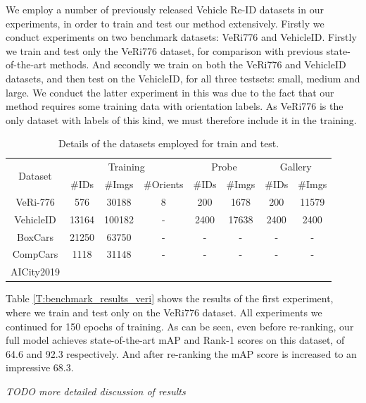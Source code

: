 \documentclass[10pt,twocolumn,letterpaper]{article}
\begin{document}
We employ a number of previously released Vehicle Re-ID datasets in our experiments, in order to train and test our method extensively. Firstly we conduct experiments on two benchmark datasets: VeRi776 and VehicleID. Firstly we train and test only the VeRi776 dataset, for comparison with previous state-of-the-art methods. And secondly we train on both the VeRi776 and VehicleID datasets, and then test on the VehicleID, for all three testsets: small, medium and large. We conduct the latter experiment in this was due to the fact that our method requires some training data with orientation labels. As VeRi776 is the only dataset with labels of this kind, we must therefore include it in the training.

\begin{table}
  \centering
  \begin{tabular}{c || c | c | c || c | c || c | c}
    \hline
    \multirow{2}{*}{Dataset} & \multicolumn{3}{c||}{Training} & \multicolumn{2}{c||}{Probe} & \multicolumn{2}{c}{Gallery} \\
    \cline{2-7}
    & \#IDs& \#Imgs & \#Orients & \#IDs & \#Imgs & \#IDs & \#Imgs \\
    \hline
    VeRi-776 \cite{} & 576 & 30188 & 8 & 200 & 1678 & 200 & 11579 \\
    VehicleID \cite{} & 13164 & 100182 & - & 2400 & 17638 & 2400 & 2400 \\
    BoxCars \cite{} & 21250 & 63750 & -  & - & - & - & - \\
    CompCars \cite{} & 1118 & 31148 & - & - & - & - & - \\
    AICity2019 \cite{} & \\
    \hline
  \end{tabular}
  \caption{Details of the datasets employed for train and test.}
  \label{T:dataset_details}
\end{table}

Table \ref{T:benchmark_results_veri} shows the results of the first experiment, where we train and test only on the VeRi776 dataset. All experiments we continued for 150 epochs of training. As can be seen, even before re-ranking, our full model achieves state-of-the-art mAP and Rank-1 scores on this dataset, of 64.6 and 92.3 respectively. And after re-ranking the mAP score is increased to an impressive 68.3.

\emph{TODO more detailed discussion of results}
\end{document}
